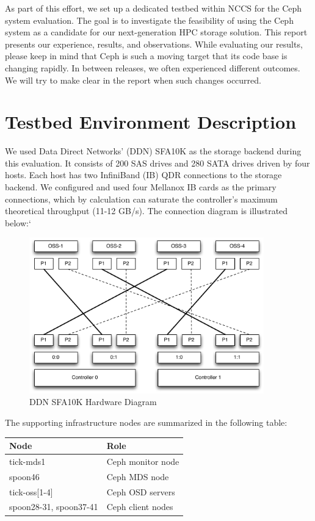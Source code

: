 \documentclass{article}
\begin{document}
As part of this effort, we set up a dedicated testbed within NCCS for the Ceph
system evaluation. The goal is to investigate the feasibility of using the Ceph system as
a candidate for our next-generation HPC storage solution.
This report presents our experience, results, and observations. While evaluating
our results, please keep in mind that Ceph is such a moving target that its
code base is changing rapidly. In between releases, we often experienced different
outcomes. We will try to make clear in the report when such changes occurred.

\section{Testbed Environment Description}

We used Data Direct Networks' (DDN) SFA10K as the storage backend during this evaluation. It consists of
200 SAS drives and 280 SATA drives driven by four hosts. Each host has two InfiniBand (IB) QDR
connections to the storage backend. We configured and used four Mellanox IB cards as the
primary connections, which by calculation can saturate the controller's maximum theoretical
throughput (11-12 GB/s). The connection diagram is illustrated below:`

\begin{figure}[htb]
\centering
\includegraphics[width=4in]{figs/sfa10k}
\caption{DDN SFA10K Hardware Diagram}
\end{figure}


The supporting infrastructure nodes are summarized in the following table:

\begin{table}[H]
\centering
    \begin{tabular}{ll}
    \toprule
    Node & Role \\
    \midrule
    tick-mds1 & Ceph monitor node \\
    spoon46 & Ceph MDS node \\
    tick-oss[1-4] & Ceph OSD servers \\
    spoon28-31, spoon37-41 & Ceph client nodes \\
    \bottomrule

    \end{tabular}

\end{table}
\end{document}
